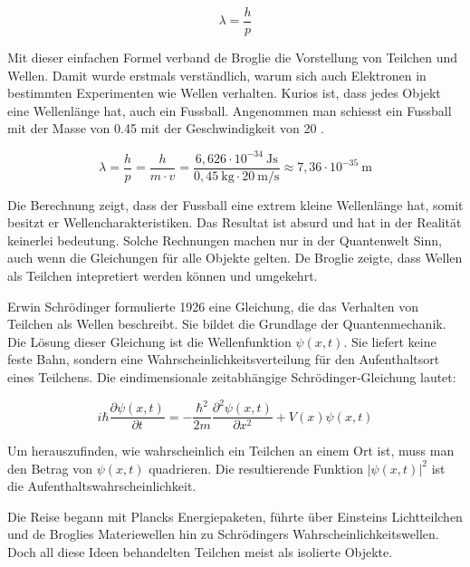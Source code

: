 	\begin{equation}
		\lambda = \frac{h}{p}
	\end{equation}	
	
	Mit dieser einfachen Formel verband de Broglie die Vorstellung von Teilchen und Wellen. Damit wurde erstmals verständlich, warum sich auch Elektronen in bestimmten Experimenten wie Wellen verhalten.
	Kurios ist, dass jedes Objekt eine Wellenlänge hat, auch ein Fussball.
	Angenommen man schiesst ein Fussball mit der Masse von 0.45  mit der Geschwindigkeit von 20 .
	
	\begin{equation}
		\lambda = \frac{h}{p} = \frac{h}{m \cdot v} = 	\frac{6{,}626 \cdot 10^{-34} \ \text{Js}}{0{,}45 \ \text{kg} \cdot 20 \ \text{m/s}} \approx 7{,}36 \cdot 10^{-35} \ \text{m}
	\end{equation}	
	
	Die Berechnung zeigt, dass der Fussball eine extrem kleine Wellenlänge hat, somit besitzt er Wellencharakteristiken.
	Das Resultat ist absurd und hat in der Realität keinerlei bedeutung.
	Solche Rechnungen machen nur in der Quantenwelt Sinn, auch wenn die Gleichungen für alle Objekte gelten. 
	De Broglie zeigte, dass Wellen als Teilchen intepretiert werden können und umgekehrt. 
	
	
	
	Erwin Schrödinger formulierte 1926 eine Gleichung, die das Verhalten von Teilchen als Wellen beschreibt. 
	Sie bildet die Grundlage der Quantenmechanik. Die Lösung dieser Gleichung ist die Wellenfunktion \( \psi(x, t) \). Sie liefert keine feste Bahn, sondern eine Wahrscheinlichkeitsverteilung für den Aufenthaltsort eines Teilchens.  
	Die eindimensionale zeitabhängige Schrödinger-Gleichung lautet:
	
	\begin{equation}\label{fourier:equation:zeitabhaengigeSchroedingerGleichung}
		i \hbar \frac{\partial \psi(x,t)}{\partial t} = -\frac{\hbar^2}{2m} \frac{\partial^2 \psi(x,t)}{\partial x^2} + V(x) \psi(x,t)
	\end{equation}
	
	
	Um herauszufinden, wie wahrscheinlich ein Teilchen an einem Ort ist, muss man den Betrag von $\psi(x, t)$ quadrieren. 
	Die resultierende Funktion $|\psi(x, t)|^2$ ist die Aufenthaltswahrscheinlichkeit. 
	
	Die Reise begann mit Plancks Energiepaketen, führte über Einsteins Lichtteilchen und de Broglies Materiewellen hin zu Schrödingers Wahrscheinlichkeitswellen. 
	Doch all diese Ideen behandelten Teilchen meist als isolierte Objekte.
	
